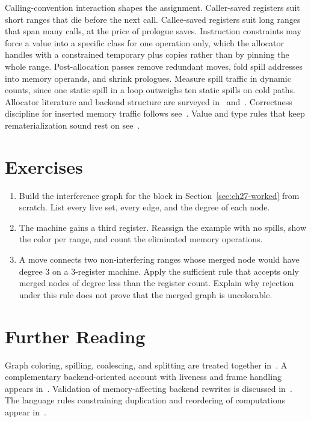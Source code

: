 Calling-convention interaction shapes the assignment.
Caller-saved registers suit short ranges that die before the next call.
Callee-saved registers suit long ranges that span many calls, at the price of prologue saves.
Instruction constraints may force a value into a specific class for one operation only, which the allocator handles with a constrained temporary plus copies rather than by pinning the whole range.
Post-allocation passes remove redundant moves, fold spill addresses into memory operands, and shrink prologues.
Measure spill traffic in dynamic counts, since one static spill in a loop outweighs ten static spills on cold paths.
Allocator literature and backend structure are surveyed in~\cite{morgan-1998-optimizing} and~\cite{appel-1998-modern}.
Correctness discipline for inserted memory traffic follows see~\cite{safonov-2010-trustworthy}.
Value and type rules that keep rematerialization sound rest on see~\cite{wg14-2011-c11}.

\section{Exercises}\label{sec:ch27-exercises}

\begin{enumerate}
\item Build the interference graph for the block in Section~\ref{sec:ch27-worked} from scratch. \label{ex:ch27-build-graph} List every live set, every edge, and the degree of each node.
\item The machine gains a third register. \label{ex:ch27-three-regs} Reassign the example with no spills, show the color per range, and count the eliminated memory operations.
\item A move  connects two non-interfering ranges whose merged node would have degree 3 on a 3-register machine. \label{ex:ch27-coalesce-test} Apply the sufficient rule that accepts only merged nodes of degree less than the register count. Explain why rejection under this rule does not prove that the merged graph is uncolorable.
\end{enumerate}

\section{Further Reading}\label{sec:ch27-reading}

Graph coloring, spilling, coalescing, and splitting are treated together in~\cite{morgan-1998-optimizing}.
A complementary backend-oriented account with liveness and frame handling appears in~\cite{appel-1998-modern}.
Validation of memory-affecting backend rewrites is discussed in~\cite{safonov-2010-trustworthy}.
The language rules constraining duplication and reordering of computations appear in~\cite{wg14-2011-c11}.
